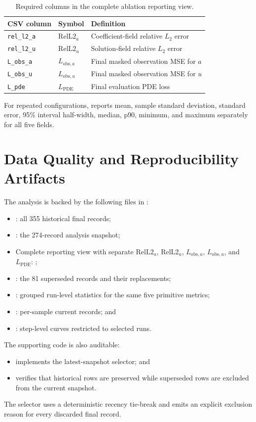 \documentclass[twoside,11pt]{article}
\newcommand{\relA}{\mathrm{RelL2}_a}
\newcommand{\relU}{\mathrm{RelL2}_u}
\newcommand{\Lobsa}{L_{\mathrm{obs},a}}
\newcommand{\Lobsu}{L_{\mathrm{obs},u}}
\newcommand{\Lpde}{L_{\mathrm{PDE}}}
\begin{document}
\begin{table}[t]
\caption{Required columns in the complete ablation reporting view.}
\label{tab:report-contract}
\centering
\begin{tabular}{lll}
\toprule
CSV column & Symbol & Definition \\
\midrule
\texttt{rel\_l2\_a} & \(\relA\) & Coefficient-field relative \(L_2\) error \\
\texttt{rel\_l2\_u} & \(\relU\) & Solution-field relative \(L_2\) error \\
\texttt{L\_obs\_a} & \(\Lobsa\) & Final masked observation MSE for \(a\) \\
\texttt{L\_obs\_u} & \(\Lobsu\) & Final masked observation MSE for \(u\) \\
\texttt{L\_pde} & \(\Lpde\) & Final evaluation PDE loss \\
\bottomrule
\end{tabular}
\end{table}

For repeated configurations, 
reports mean, sample standard deviation, standard error, 95\% interval
half-width, median, p90, minimum, and maximum separately for all five fields.

\section{Data Quality and Reproducibility Artifacts}
\label{app:artifacts}

The analysis is backed by the following files in :
\begin{itemize}
  \item {}: all 355 historical final records;
  \item {}: the 274-record analysis snapshot;
  \item Complete reporting view with separate \(\relA\), \(\relU\),
        \(\Lobsa\), \(\Lobsu\), and \(\Lpde\):
        ;
  \item {}: the 81 superseded records and their replacements;
  \item {}: grouped run-level
        statistics for the same five primitive metrics;
  \item {}: per-sample current records; and
  \item {}: step-level curves restricted to selected runs.
\end{itemize}

The supporting code is also auditable:
\begin{itemize}
  \item {} implements the latest-snapshot selector; and
  \item {} verifies that historical rows are preserved while superseded rows are excluded from the current snapshot.
\end{itemize}
The selector uses a deterministic recency tie-break and emits an explicit
exclusion reason for every discarded final record.
\end{document}
